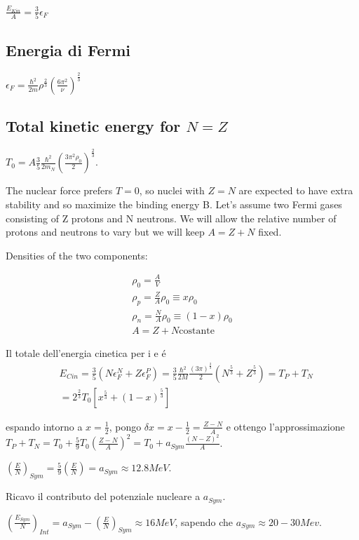 \documentclass[main.tex]{subfiles}
\begin{document}
$\frac{E_{Kin}}{A}=\frac{3}{5}\epsilon_F$

\subsection{Energia di Fermi}

$\epsilon_F=\frac{\hbar^2}{2m}\rho^{\frac{2}{3}}(\frac{6\pi^2}{\nu})^{\frac{2}{3}}$
\subsection{Total kinetic energy for $N=Z$} 
$T_0=A\frac{3}{5}\frac{\hbar^2}{2m_N}(\frac{3\pi^2\rho_0}{2})^{\frac{2}{3}}$.

The nuclear force prefers $T = 0$, so nuclei with $Z = N$ are expected to have extra stability and so maximize the binding energy B. Let's assume two Fermi gases consisting of Z protons and N neutrons. We will allow the relative number of protons and neutrons to vary but we will keep $A = Z + N$ fixed.

Densities of the two components:

\begin{align*}
\rho_0=\frac{A}{V}\\
\rho_p=\frac{Z}{A}\rho_0\equiv x\rho_0\\
\rho_n=\frac{N}{A}\rho_0\equiv (1-x)\rho_0\\
A=Z+N \text{costante}
\end{align*}

Il totale dell'energia cinetica per i \Pproton e \Pneutron \'e
\begin{align*}
&E_{Cin}=\frac{3}{5}(N\epsilon_F^N+Z\epsilon_F^P)=\frac{3}{5}\frac{\hbar^2}{2M}\frac{(3\pi)^\frac{2}{3}}{2}(N^{\frac{5}{3}}+Z^{\frac{5}{3}})=T_P+T_N\\
&=2^\frac{2}{3}T_0[x^\frac{5}{3}+(1-x)^\frac{5}{3}]
\end{align*}

espando intorno a $x=\frac{1}{2}$, pongo $\delta x=x-\frac{1}{2}=\frac{Z-N}{A}$ e ottengo l'approssimazione  $T_P+T_N=T_0+\frac{5}{9}T_0(\frac{Z-N}{A})^2=T_0+a_{Sym}\frac{(N-Z)^2}{A}$.

 $(\frac{E}{N})_{Sym}=\frac{5}{9}(\frac{E}{N})=a_{Sym}\approx 12.8 MeV$. 
 
 Ricavo il contributo del potenziale nucleare a $a_{Sym}$.

$(\frac{E_{Sym}}{N})_{Int}=a_{Sym}-(\frac{E}{N})_{Sym}\approx16 MeV$, sapendo che $a_{Sym}\approx20-30 Mev$.
\end{document}
